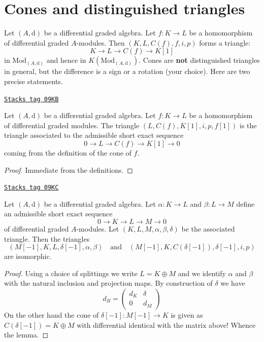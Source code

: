 \section{Cones and distinguished triangles}
\label{dga-section-cones-and-triangles}
Let $(A, \text{d})$ be a differential graded algebra.
Let $f : K \to L$ be a homomorphism of differential graded $A$-modules.
Then $(K, L, C(f), f, i, p)$ forms a triangle:
$$
K \to L \to C(f) \to K[1]
$$
in $\text{Mod}_{(A, \text{d})}$ and hence in $K(\text{Mod}_{(A, \text{d})})$.
Cones are {\bf not} distinguished triangles in general, but the difference
is a sign or a rotation (your choice). Here are two precise statements.

\begin{lemma}
\label{dga-lemma-rotate-cone}
\href{https://stacks.math.columbia.edu/tag/09KB}{\texttt{Stacks tag 09KB}}

Let $(A, \text{d})$ be a differential graded algebra.
Let $f : K \to L$ be a homomorphism of differential graded modules.
The triangle $(L, C(f), K[1], i, p, f[1])$ is
the triangle associated to the admissible short exact sequence
$$
0 \to L \to C(f) \to K[1] \to 0
$$
coming from the definition of the cone of $f$.
\end{lemma}

\begin{proof}
Immediate from the definitions.
\end{proof}

\begin{lemma}
\label{dga-lemma-rotate-triangle}
\href{https://stacks.math.columbia.edu/tag/09KC}{\texttt{Stacks tag 09KC}}

Let $(A, \text{d})$ be a differential graded algebra.
Let $\alpha : K \to L$ and $\beta : L \to M$
define an admissible short exact sequence
$$
0 \to K \to L \to M \to 0
$$
of differential graded $A$-modules.
Let $(K, L, M, \alpha, \beta, \delta)$
be the associated triangle. Then the triangles
$$
(M[-1], K, L, \delta[-1], \alpha, \beta)
\quad\text{and}\quad
(M[-1], K, C(\delta[-1]), \delta[-1], i, p)
$$
are isomorphic.
\end{lemma}

\begin{proof}
Using a choice of splittings we write $L = K \oplus M$ and we identify
$\alpha$ and $\beta$ with the natural inclusion and projection maps.
By construction of $\delta$ we have
$$
d_B =
\left(
\begin{matrix}
d_K & \delta \\
0 & d_M
\end{matrix}
\right)
$$
On the other hand the cone of $\delta[-1] : M[-1] \to K$
is given as $C(\delta[-1]) = K \oplus M$ with differential identical
with the matrix above! Whence the lemma.
\end{proof}

